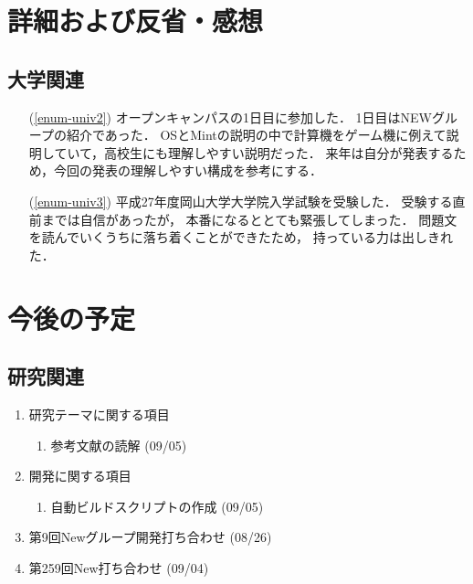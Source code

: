 \documentclass[fleqn, 14pt]{extarticle}
\begin{document}
\section{詳細および反省・感想}
\label{sec-3}
\subsection{大学関連}
\label{sec-3-1}

\begin{itemize}
\item[(\ref{enum-univ2})]
オープンキャンパスの1日目に参加した．
1日目はNEWグループの紹介であった．
OSとMintの説明の中で計算機をゲーム機に例えて説明していて，高校生にも理解しやすい説明だった．
来年は自分が発表するため，今回の発表の理解しやすい構成を参考にする．
\item[(\ref{enum-univ3})]
平成27年度岡山大学大学院入学試験を受験した．
受験する直前までは自信があったが，
本番になるととても緊張してしまった．
問題文を読んでいくうちに落ち着くことができたため，
持っている力は出しきれた．
\end{itemize}


\section{今後の予定}
\label{sec-4}
\subsection{研究関連}
\label{sec-4-1}

\begin{enumerate}
\item 研究テーマに関する項目
\hfill
\begin{enumerate}


\item 参考文献の読解
\hfill
(09/05)

\end{enumerate}
\item 開発に関する項目
\hfill
\begin{enumerate}

\item 自動ビルドスクリプトの作成
\hfill
(09/05)

\end{enumerate}
\item 第9回Newグループ開発打ち合わせ
\hfill
\label{enum-7}
(08/26)
\item 第259回New打ち合わせ
\hfill
\label{enum-3}
(09/04)
\end{enumerate}
\end{document}
